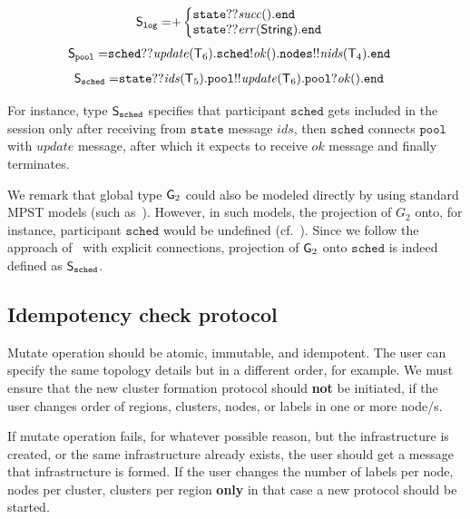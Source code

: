 \begin{align*}
	\ST_\mathtt{log} =& 
	{+}
	\left\{
	\begin{array}{@{}l@{}}
	\mathtt{state}{??}\mathit{succ}().\tend\\
	\mathtt{state}{??}\mathit{err}(\mathsf{String}).\tend
	\end{array} \right.
\end{align*}
\begin{align*}
	{\mathsf S}_\mathtt{pool} =&
	\mathtt{sched}{??}\mathit{update}({\mathsf T}_6).
	\mathtt{sched}{!}\mathit{ok}(). 
	\mathtt{nodes}{!!}\mathit{nids}({\mathsf T}_4).\mathtt{end}
\end{align*}
\begin{align*}
	{\mathsf S}_\mathtt{sched} =& 
	\mathtt{state}{??}\mathit{ids}({\mathsf T}_5).
	\mathtt{pool}{!!}\mathit{update}({\mathsf T}_6).
	\mathtt{pool}{?}\mathit{ok}().\mathtt{end}
\end{align*}

\noindent
For instance, type ${\mathsf S}_\mathtt{sched}$ specifies that participant $\mathtt{sched}$ gets included in the session only after receiving from $\mathtt{state}$ message $\mathit{ids}$, then $\mathtt{sched}$ connects $\mathtt{pool}$ with $\mathit{update}$ message, after which it expects to receive $\mathit{ok}$ message and finally terminates. 

We remark that global type ${\sf G}_2$ could also be modeled directly by using standard MPST models (such as~\cite{HondaYC08}). However, in such models, the projection of $G_2$ onto, for instance, participant $\mathtt{sched}$ would be undefined (cf.~\cite{HuY17}).
Since we follow the approach of~\cite{HuY17} with explicit connections, projection of ${\sf G}_2$ onto $\mathtt{sched}$ is indeed defined as ${\mathsf S}_\mathtt{sched}$.
%
%
\subsection{Idempotency check protocol}\label{sec:idempotency_protocol}
%
Mutate operation should be atomic, immutable, and idempotent. The user can specify the same topology details but in a different order, for example. We must ensure that the new cluster formation protocol should \textbf{not} be initiated, if the user changes order of regions, clusters, nodes, or labels in one or more node/s. 

If mutate operation fails, for whatever possible reason, but the infrastructure is created, or the same infrastructure already exists, the user should get a message that infrastructure is formed. If the user changes the number of labels per node, nodes per cluster, clusters per region \textbf{only} in that case a new protocol should be started.

